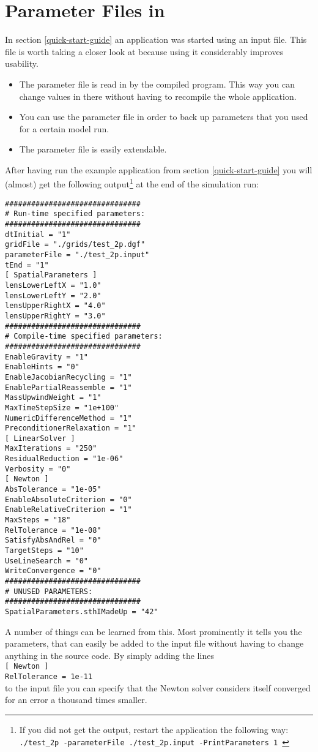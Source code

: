 \section{Parameter Files in \Dumux}
\label{sec:inputFiles}
In section \ref{quick-start-guide} an application was started using an input file. 
This file is worth taking a closer look at because using it considerably improves usability. 

\begin{itemize}
 \item The parameter file is read in by the compiled program. This way you can change 
values in there without having to recompile the whole application. 
\item You can use the parameter file in order to back up parameters that you used for a certain model run. 
\item The parameter file is easily extendable. 
\end{itemize}

After having run the example application from section \ref{quick-start-guide} you will (almost) get the following output\footnote{If you did not get the output, restart the application the following way:
  \texttt{./test{\_}2p -parameterFile ./test\_2p.input -PrintParameters 1 }} at the end of the simulation run:
\begin{lstlisting}[style=Bash]
###############################
# Run-time specified parameters:
###############################
dtInitial = "1"
gridFile = "./grids/test_2p.dgf"
parameterFile = "./test_2p.input"
tEnd = "1"
[ SpatialParameters ]
lensLowerLeftX = "1.0"
lensLowerLeftY = "2.0"
lensUpperRightX = "4.0"
lensUpperRightY = "3.0"
###############################
# Compile-time specified parameters:
###############################
EnableGravity = "1"
EnableHints = "0"
EnableJacobianRecycling = "1"
EnablePartialReassemble = "1"
MassUpwindWeight = "1"
MaxTimeStepSize = "1e+100"
NumericDifferenceMethod = "1"
PreconditionerRelaxation = "1"
[ LinearSolver ]
MaxIterations = "250"
ResidualReduction = "1e-06"
Verbosity = "0"
[ Newton ]
AbsTolerance = "1e-05"
EnableAbsoluteCriterion = "0"
EnableRelativeCriterion = "1"
MaxSteps = "18"
RelTolerance = "1e-08"
SatisfyAbsAndRel = "0"
TargetSteps = "10"
UseLineSearch = "0"
WriteConvergence = "0"
###############################
# UNUSED PARAMETERS:
###############################
SpatialParameters.sthIMadeUp = "42"
\end{lstlisting}

A number of things can be learned from this. Most prominently it tells you the parameters, that can easily be added to the input file without having to change anything in the source code. 
By simply adding the lines\\
\texttt{[ Newton ]\\
RelTolerance = 1e-11}\\
to the input file you can specify that the Newton solver considers itself converged for an error a thousand times smaller. 

